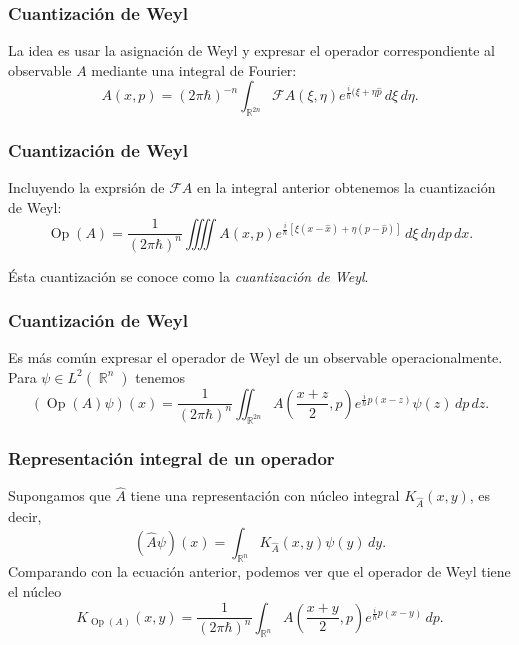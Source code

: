 \documentclass{beamer}
\DeclareMathOperator{\R}{\mathbb{R}}
\DeclareMathOperator{\Op}{Op}
\begin{document}
\begin{frame}
  \frametitle{Cuantización de Weyl}

  La idea es usar la asignación de Weyl y expresar el
  operador correspondiente al observable $A$ mediante una
  integral de Fourier:
  \begin{equation}
    A(x,p) = (2\pi\hbar)^{-n} \int_{\R^{2n}}
    \mathcal{F}A(\xi,\eta) e^{\frac{i}{\hbar} (\xi \hat{} + \eta
    \hat{p}} \, d\xi \, d\eta.
  \end{equation}
\end{frame}

\begin{frame}
  \frametitle{Cuantización de Weyl}

  Incluyendo la exprsión de $\mathcal{F}A$ en la integral
  anterior obtenemos la cuantización de Weyl:
  \begin{equation}
    \label{eqn:weyl}
    \Op(A)
    = \frac{1}{(2\pi\hbar)^{n}} 
    \iiiint A(x,p) e^{\frac{i}{\hbar}[\xi(x-\hat{x}) +
    \eta(p-\hat{p})]} \, d\xi \, d\eta \, dp \, dx.
  \end{equation}

  Ésta cuantización se conoce como la \textit{cuantización
  de Weyl}.
\end{frame}

\begin{frame}
  \frametitle{Cuantización de Weyl}

  Es más común expresar el operador de Weyl de un observable
  operacionalmente. Para $\psi \in L^2(\R^{n})$ tenemos
  \begin{equation}
    (\Op(A)\psi)(x)
    = \frac{1}{(2\pi\hbar)^{n}} \iint_{\R^{2n}} A\left(
    \frac{x + z}{2}, p \right) e^{\frac{i}{\hbar} p (x -
  z)} \psi(z) \, dp \, dz.
  \end{equation}
\end{frame}

\begin{frame}
  \frametitle{Representación integral de un operador}

  Supongamos que $\hat{A}$ tiene una representación con
  núcleo integral $K_{\hat{A}}(x,y)$, es decir,
  \begin{equation}
    (\hat{A}\psi)(x)
    = \int_{\R^{n}} K_{\hat{A}}(x,y)\psi(y) \, dy.
  \end{equation}
  Comparando con la ecuación anterior, podemos ver que el
  operador de Weyl tiene el núcleo
  \begin{equation}
    K_{\Op(A)}(x,y)
    = \frac{1}{(2\pi\hbar)^{n}} 
    \int_{\R^{n}} A\left( \frac{x+y}{2}, p \right)
    e^{\frac{i}{\hbar} p (x-y)} \, dp.
  \end{equation}
\end{frame}
\end{document}
